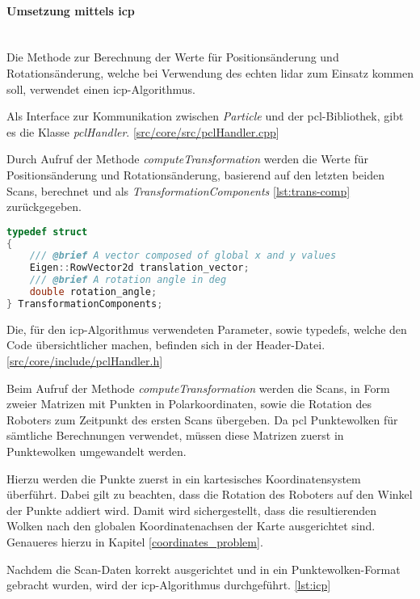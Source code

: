 \paragraph{Umsetzung mittels \ac{icp}} \mbox{}\\
Die Methode zur Berechnung der Werte für Positionsänderung und Rotationsänderung,
welche bei Verwendung des echten \ac{lidar} zum Einsatz kommen soll, verwendet einen \ac{icp}-Algorithmus.

Als Interface zur Kommunikation zwischen \textit{Particle} und der \ac{pcl}-Bibliothek, gibt es die Klasse \textit{pclHandler}.
[\href{https://github.com/Jundy0/Studienarbeit/blob/main/src/core/src/pclHandler.cpp}{src/core/src/pclHandler.cpp}]

Durch Aufruf der Methode \textit{computeTransformation} werden die Werte für Positionsänderung und Rotationsänderung, 
basierend auf den letzten beiden Scans, berechnet und als \textit{TransformationComponents} \ref{lst:trans-comp} zurückgegeben.

\begin{lstlisting}[caption={Aufbau \textit{TransformationComponents}},label={lst:trans-comp},language={C++}]
typedef struct
{
    /// @brief A vector composed of global x and y values
    Eigen::RowVector2d translation_vector;
    /// @brief A rotation angle in deg
    double rotation_angle;
} TransformationComponents;
\end{lstlisting}

Die, für den \ac{icp}-Algorithmus verwendeten Parameter, sowie typedefs, welche den Code übersichtlicher machen, befinden sich in der Header-Datei.
[\href{https://github.com/Jundy0/Studienarbeit/blob/main/src/core/include/pclHandler.h}{src/core/include/pclHandler.h}]

Beim Aufruf der Methode \textit{computeTransformation} werden die Scans, in Form zweier Matrizen mit Punkten in Polarkoordinaten, 
sowie die Rotation des Roboters zum Zeitpunkt des ersten Scans übergeben.
Da \ac{pcl} Punktewolken für sämtliche Berechnungen verwendet, müssen diese Matrizen zuerst in Punktewolken umgewandelt werden.

Hierzu werden die Punkte zuerst in ein kartesisches Koordinatensystem überführt.
Dabei gilt zu beachten, dass die Rotation des Roboters auf den Winkel der Punkte addiert wird.
Damit wird sichergestellt, dass die resultierenden Wolken nach den globalen Koordinatenachsen der Karte ausgerichtet sind.
Genaueres hierzu in Kapitel \ref{coordinates_problem}.

Nachdem die Scan-Daten korrekt ausgerichtet und in ein Punktewolken-Format gebracht wurden, wird der \ac{icp}-Algorithmus durchgeführt. \ref{lst:icp}


